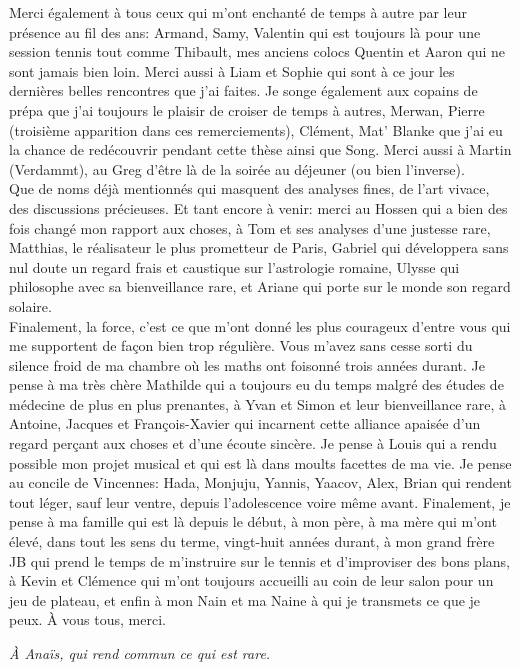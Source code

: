 Merci également à tous ceux qui m'ont enchanté de temps à autre par leur présence au fil des ans: Armand, Samy, Valentin qui est toujours là pour une session tennis tout comme Thibault, mes anciens colocs Quentin et Aaron qui ne sont jamais bien loin. Merci aussi à Liam et Sophie qui sont à ce jour les dernières belles rencontres que j'ai faites.
Je songe également aux copains de prépa que j'ai toujours le plaisir de croiser de temps à autres, Merwan, Pierre (troisième apparition dans ces remerciements), Clément, Mat' Blanke que j'ai eu la chance de redécouvrir pendant cette thèse ainsi que Song. Merci aussi à Martin (Verdammt), au Greg d'être là de la soirée au déjeuner (ou bien l'inverse).\\  
Que de noms déjà mentionnés qui masquent des analyses fines, de l'art vivace, des discussions précieuses. Et tant encore à venir: merci au Hossen qui a bien des fois changé mon rapport aux choses, à Tom et ses analyses d'une justesse rare, Matthias, le réalisateur le plus prometteur de Paris, Gabriel qui développera sans nul doute un regard frais et caustique sur l'astrologie romaine, Ulysse qui philosophe avec sa bienveillance rare, et Ariane qui porte sur le monde son regard solaire.\\
Finalement, la force, c'est ce que m'ont donné les plus courageux d'entre vous qui me supportent de façon bien trop régulière. Vous m'avez sans cesse sorti du silence froid de ma chambre où les maths ont foisonné trois années durant. Je pense à ma très chère Mathilde qui a toujours eu du temps malgré des études de médecine de plus en plus prenantes, à Yvan et Simon et leur bienveillance rare, à Antoine, Jacques et François-Xavier qui incarnent cette alliance apaisée d'un regard perçant aux choses et d'une écoute sincère. Je pense à Louis qui a rendu possible mon projet musical et qui est là dans moults facettes de ma vie. Je pense au concile de Vincennes: Hada, Monjuju, Yannis, Yaacov, Alex, Brian qui rendent tout léger, sauf leur ventre, depuis l'adolescence voire même avant. Finalement, je pense à ma famille qui est là depuis le début, à mon père, à ma mère qui m'ont élevé, dans tout les sens du terme, vingt-huit années durant, à mon grand frère JB qui prend le temps de m'instruire sur le tennis et d'improviser des bons plans, à Kevin et Clémence qui m'ont toujours accueilli au coin de leur salon pour un jeu de plateau, et enfin à mon Nain et ma Naine à qui je transmets ce que je peux. À vous tous, merci.

\newpage
\textit{À Anaïs, qui rend commun ce qui est rare.}